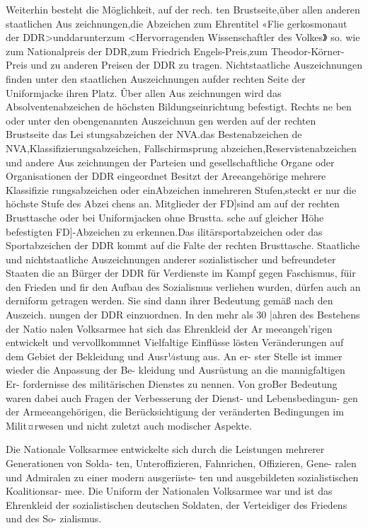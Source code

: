 Weiterhin besteht die Möglichkeit, auf der rech.
ten Brustseite,über allen anderen staatlichen Aus
zeichnungen,die Abzeichen zum Ehrentitel «Flie
gerkosmonaut der DDR>unddarunterzum
<Hervorragenden Wissenschaftler des Volkes》 so.
wie zum Nationalpreis der DDR,zum Friedrich
Engels-Preis,zum Theodor-Körner-Preis und zu
anderen Preisen der DDR zu tragen.
Nichtstaatliche Auszeichnungen finden unter
den staatlichen Auszeichnungen aufder rechten
Seite der Uniformjacke ihren Platz. Ûber allen Aus
zeichnungen wird das Absolventenabzeichen de
höchsten Bildungseinrichtung befestigt. Rechts ne
ben oder unter den obengenannten Auszeichnun
gen werden auf der rechten Brustseite das Lei
stungsabzeichen der NVA.das Bestenabzeichen de
NVA,Klassifizierungsabzeichen, Fallschirmsprung
abzeichen,Reservistenabzeichen und andere Aus
zeichnungen der Parteien und gesellschaftliche
Organe oder Organisationen der DDR eingeordnet
Besitzt der Areeangehörige mehrere Klassifizie
rungsabzeichen oder einAbzeichen inmehreren
Stufen,steckt er nur die höchste Stufe des Abzei
chens an.
Mitglieder der FD]sind am auf der rechten
Brusttasche oder bei Uniformjacken ohne Brustta.
sche auf gleicher Höhe befestigten FD]-Abzeichen
zu erkennen.Das ilitärsportabzeichen oder das
Sportabzeichen der DDR kommt auf die Falte der
rechten Brusttasche.
Staatliche und nichtstaatliche Auszeichnungen
anderer sozialistischer und befreundeter Staaten
die an Bürger der DDR für Verdienste im Kampf
gegen Faschismus, füir den Frieden und fir den
Aufbau des Sozialismus verliehen wurden, dürfen
auch an derniform getragen werden. Sie sind
dann ihrer Bedeutung gemäß nach den Auszeich.
nungen der DDR einzuordnen.
In den mehr als 30 |ahren des Bestehens der Natio
nalen Volksarmee hat sich das Ehrenkleid der Ar
meeangeh'rigen entwickelt und vervollkommnet
Vielfaltige Einflüsse lösten Veränderungen auf dem Gebiet der Bekleidung und Ausr¼stung aus. An er-
ster Stelle ist immer wieder die Anpassung der Be-
kleidung und Ausrüstung an die mannigfaltigen Er-
fordernisse des militärischen Dienstes zu nennen.
Von groBer Bedeutung waren dabei auch Fragen
der Verbesserung der Dienst- und Lebensbedingun-
gen der Armeeangehörigen, die Berücksichtigung
der veränderten Bedingungen im Milit¤rwesen und
nicht zuletzt auch modischer Aspekte.

Die Nationale Volksarmee entwickelte sich durch
die Leistungen mehrerer Generationen von Solda-
ten, Unteroffizieren, Fahnrichen, Offizieren, Gene-
ralen und Admiralen zu einer modern ausgeriiste-
ten und ausgebildeten sozialistischen Koalitionsar-
mee. Die Uniform der Nationalen Volksarmee war
und ist das Ehrenkleid der sozialistischen deutschen
Soldaten, der Verteidiger des Friedens und des So-
zialismus.